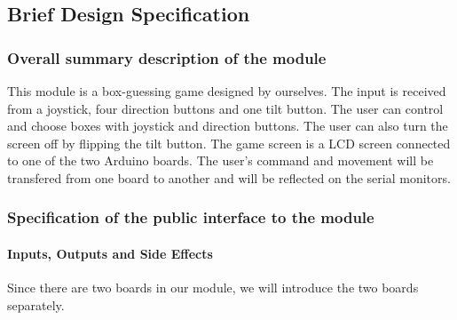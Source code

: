 \subsection{Brief Design Specification}
\subsubsection{Overall summary description of the module}
This module is a box-guessing game designed by ourselves. The input is received from a joystick, four direction buttons and one tilt button. The user can control and choose boxes with joystick and direction buttons. The user can also turn the screen off by flipping the tilt button. The game screen is a LCD screen connected to one of the two Arduino boards. The user's command and movement will be transfered from one board to another and will be reflected on the serial monitors.

\subsubsection{Specification of the public interface to the module}
\paragraph{Inputs, Outputs and Side Effects}
\hfill \newline
Since there are two boards in our module, we will introduce the two boards separately.

